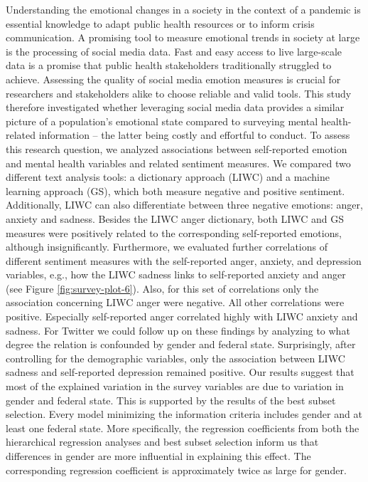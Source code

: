 \documentclass[
  english,
  jou,floatsintext]{apa7}
\begin{document}
Understanding the emotional changes in a society in the context of a pandemic is essential knowledge to adapt public health resources or to inform crisis communication. A promising tool to measure emotional trends in society at large is the processing of social media data. Fast and easy access to live large-scale data is a promise that public health stakeholders traditionally struggled to achieve. Assessing the quality of social media emotion measures is crucial for researchers and stakeholders alike to choose reliable and valid tools. This study therefore investigated whether leveraging social media data provides a similar picture of a population's emotional state compared to surveying mental health-related information -- the latter being costly and effortful to conduct. To assess this research question, we analyzed associations between self-reported emotion and mental health variables and related sentiment measures. We compared two different text analysis tools: a dictionary approach (LIWC) and a machine learning approach (GS), which both measure negative and positive sentiment. Additionally, LIWC can also differentiate between three negative emotions: anger, anxiety and sadness.
Besides the LIWC anger dictionary, both LIWC and GS measures were positively related to the corresponding self-reported emotions, although insignificantly.
Furthermore, we evaluated further correlations of different sentiment measures with the self-reported anger, anxiety, and depression variables, e.g., how the LIWC sadness links to self-reported anxiety and anger (see Figure \ref{fig:survey-plot-6}).
Also, for this set of correlations only the association concerning LIWC anger were negative. All other correlations were positive. Especially self-reported anger correlated highly with LIWC anxiety and sadness.
For Twitter we could follow up on these findings by analyzing to what degree the relation is confounded by gender and federal state. Surprisingly, after controlling for the demographic variables, only the association between LIWC sadness and self-reported depression remained positive. Our results suggest that most of the explained variation in the survey variables are due to variation in gender and federal state. This is supported by the results of the best subset selection. Every model minimizing the information criteria includes gender and at least one federal state. More specifically, the regression coefficients from both the hierarchical regression analyses and best subset selection inform us that differences in gender are more influential in explaining this effect. The corresponding regression coefficient is approximately twice as large for gender.\\
\end{document}
